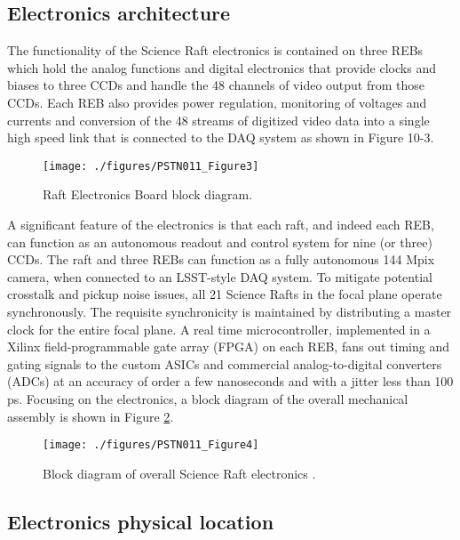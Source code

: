 \subsection{Electronics architecture}
The functionality of the Science Raft electronics is contained on three REBs which hold the analog functions and digital electronics that provide clocks and biases to three CCDs and handle the 48 channels of video output from those CCDs. Each REB also provides power regulation, monitoring of voltages and currents and conversion of the 48 streams of digitized video data into a single high speed link that is connected to the DAQ system as shown in Figure 10-3. 
 
\begin{figure}[htbp]
\begin{center}
\texttt{[image: ./figures/PSTN011\_Figure3]}
\caption{Raft Electronics Board block diagram.}
\label{fig:Fig3}
\end{center}
\end{figure}

A significant feature of the electronics is that each raft, and indeed each REB, can function as an autonomous readout and control system for nine (or three) CCDs. The raft and three REBs can function as a fully autonomous 144 Mpix camera, when connected to an LSST-style DAQ system.
To mitigate potential crosstalk and pickup noise issues, all 21 Science Rafts in the focal plane operate synchronously. The requisite synchronicity is maintained by distributing a master clock for the entire focal plane. A real time microcontroller, implemented in a Xilinx field-programmable gate array (FPGA) on each REB, fans out timing and gating signals to the custom ASICs and commercial analog-to-digital converters (ADCs) at an accuracy of order a few nanoseconds and with a jitter less than 100 ps. 
Focusing on the electronics, a block diagram of the overall mechanical assembly is shown in Figure \ref{fig:Fig4}.

\begin{figure}[htbp]
\begin{center}
\texttt{[image: ./figures/PSTN011\_Figure4]}
\caption{Block diagram of overall Science Raft electronics .}
\label{fig:Fig4}
\end{center}
\end{figure}
  
\subsection{Electronics physical location}

